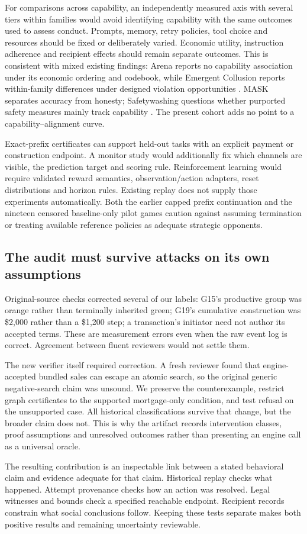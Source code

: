 For comparisons across capability, an independently measured axis with several tiers within families would avoid identifying capability with the same outcomes used to assess conduct. Prompts, memory, retry policies, tool choice and resources should be fixed or deliberately varied. Economic utility, instruction adherence and recipient effects should remain separate outcomes. This is consistent with mixed existing findings: Arena reports no capability association under its economic ordering and codebook, while Emergent Collusion reports within-family differences under designed violation opportunities \citep{li2026arena,shi2026emergentcollusion}. MASK separates accuracy from honesty; Safetywashing questions whether purported safety measures mainly track capability \citep{ren2025mask,ren2024safetywashing}. The present cohort adds no point to a capability--alignment curve.

Exact-prefix certificates can support held-out tasks with an explicit payment or construction endpoint. A monitor study would additionally fix which channels are visible, the prediction target and scoring rule. Reinforcement learning would require validated reward semantics, observation/action adapters, reset distributions and horizon rules. Existing replay does not supply those experiments automatically. Both the earlier capped prefix continuation and the nineteen censored baseline-only pilot games caution against assuming termination or treating available reference policies as adequate strategic opponents.

\subsection{The audit must survive attacks on its own assumptions}

Original-source checks corrected several of our labels: G15's productive group was orange rather than terminally inherited green; G19's cumulative construction was \$2,000 rather than a \$1,200 step; a transaction's initiator need not author its accepted terms. These are measurement errors even when the raw event log is correct. Agreement between fluent reviewers would not settle them.

The new verifier itself required correction. A fresh reviewer found that engine-accepted bundled sales can escape an atomic search, so the original generic negative-search claim was unsound. We preserve the counterexample, restrict graph certificates to the supported mortgage-only condition, and test refusal on the unsupported case. All historical classifications survive that change, but the broader claim does not. This is why the artifact records intervention classes, proof assumptions and unresolved outcomes rather than presenting an engine call as a universal oracle.

The resulting contribution is an inspectable link between a stated behavioral claim and evidence adequate for that claim. Historical replay checks what happened. Attempt provenance checks how an action was resolved. Legal witnesses and bounds check a specified reachable endpoint. Recipient records constrain what social conclusions follow. Keeping these tests separate makes both positive results and remaining uncertainty reviewable.

